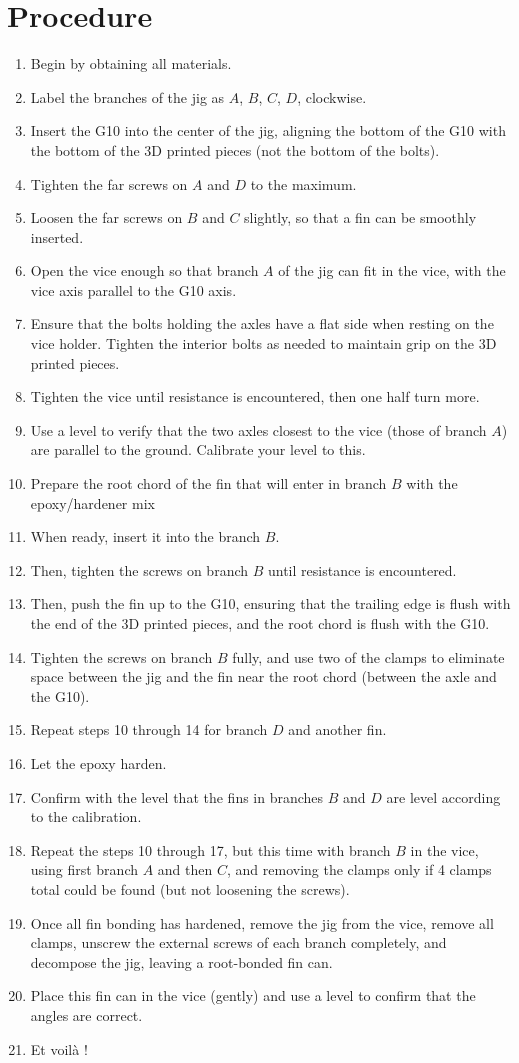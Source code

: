 \documentclass{amsdtx}
\begin{document}
\section{Procedure}
\begin{enumerate}
	\item Begin by obtaining all materials.
	\item Label the branches of the jig as $A$, $B$, $C$, $D$, clockwise.
	\item Insert the G10 into the center of the jig, aligning the bottom of the G10 with the bottom of the 3D printed pieces (not the bottom of the bolts).
	\item Tighten the far screws on $A$ and $D$ to the maximum.
	\item Loosen the far screws on $B$ and $C$ slightly, so that a fin can be smoothly inserted. 
	\item Open the vice enough so that branch $A$ of the jig can fit in the vice, with the vice axis parallel to the G10 axis.
	\item Ensure that the bolts holding the axles have a flat side when resting on the vice holder. Tighten the interior bolts as needed to maintain grip on the 3D printed pieces.
	\item Tighten the vice until resistance is encountered, then one half turn more.
	\item Use a level to verify that the two axles closest to the vice (those of branch $A$) are parallel to the ground. Calibrate your level to this.
	\item Prepare the root chord of the fin that will enter in branch $B$ with the epoxy/hardener mix
	\item When ready, insert it into the branch $B$. 
	\item Then, tighten the screws on branch $B$ until resistance is encountered.
	\item Then, push the fin up to the G10, ensuring that the trailing edge is flush with the end of the 3D printed pieces, and the root chord is flush with the G10.
	\item Tighten the screws on branch $B$ fully, and use two of the clamps to eliminate space between the jig and the fin near the root chord (between the axle and the G10).
	\item Repeat steps 10 through 14 for branch $D$ and another fin.
	\item Let the epoxy harden.
	\item Confirm with the level that the fins in branches $B$ and $D$ are level according to the calibration.
	\item Repeat the steps 10 through 17, but this time with branch $B$ in the vice, using first branch $A$ and then $C$, and removing the clamps only if 4 clamps total could be found (but not loosening the screws).
	\item Once all fin bonding has hardened, remove the jig from the vice, remove all clamps, unscrew the external screws of each branch completely, and decompose the jig, leaving a root-bonded fin can. 
	\item Place this fin can in the vice (gently) and use a level to confirm that the angles are correct.
	\item Et voil\`a !
\end{enumerate}
\end{document}
